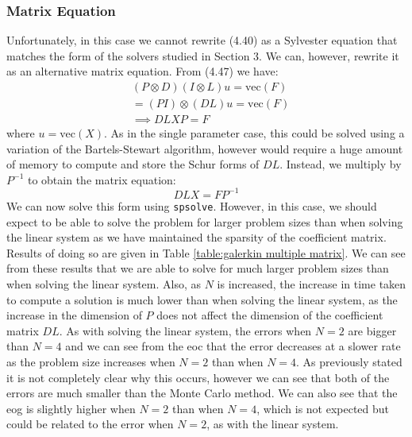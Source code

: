 \documentclass[11pt]{article}
\numberwithin{equation}{section}
\begin{document}
\subsubsection{Matrix Equation}
Unfortunately, in this case we cannot rewrite (4.40) as a Sylvester equation that matches the form of the solvers studied in Section 3. We can, however, rewrite it as an alternative matrix equation. From (4.47) we have:
\begin{equation}
\begin{split}
& (P \otimes D)(I \otimes L) u = \text{vec}(F) \\
& = (PI) \otimes (DL) u = \text{vec}(F) \\
& \implies DL X P = F 
\end{split}
\end{equation}
where $u = \text{vec}(X)$. As in the single parameter case, this could be solved using a variation of the Bartels-Stewart algorithm, however would require a huge amount of memory to compute and store the Schur forms of $DL$. Instead, we multiply by $P^{-1}$ to obtain the matrix equation:
\begin{equation}
DL X = F P^{-1}
\end{equation}
We can now solve this form using \texttt{spsolve}. However, in this case, we should expect to be able to solve the problem for larger problem sizes than when solving the linear system as we have maintained the sparsity of the coefficient matrix. Results of doing so are given in Table \ref{table:galerkin multiple matrix}. We can see from these results that we are able to solve for much larger problem sizes than when solving the linear system. Also, as $N$ is increased, the increase in time taken to compute a solution is much lower than when solving the linear system, as the increase in the dimension of $P$ does not affect the dimension of the coefficient matrix $DL$. As with solving the linear system, the errors when $N=2$ are bigger than $N=4$ and we can see from the eoc that the error decreases at a slower rate as the problem size increases when $N=2$ than when $N=4$. As previously stated it is not completely clear why this occurs, however we can see that both of the errors are much smaller than the Monte Carlo method. We can also see that the eog is slightly higher when $N=2$ than when $N=4$, which is not expected but could be related to the error when $N=2$, as with the linear system. 
\end{document}
